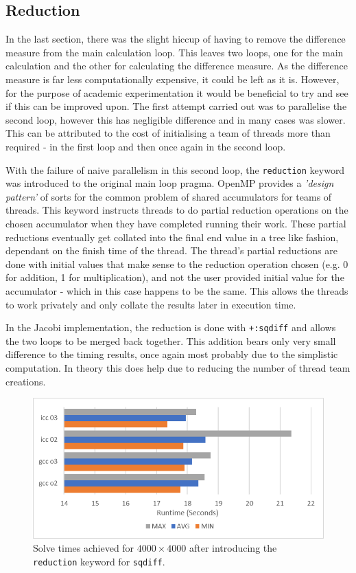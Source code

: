 \documentclass[11pt,twocolumn,a4paper]{article}
\begin{document}
\subsection{Reduction}
In the last section, there was the slight hiccup of having to remove the difference measure from the main calculation loop. This leaves two loops, one for the main calculation and the other for calculating the difference measure. As the difference measure is far less computationally expensive, it could be left as it is. However, for the purpose of academic experimentation it would be beneficial to try and see if this can be improved upon. The first attempt carried out was to parallelise the second loop, however this has negligible difference and in many cases was slower. This can be attributed to the cost of initialising a team of threads more than required - in the first loop and then once again in the second loop. \par

With the failure of naive parallelism in this second loop, the \texttt{reduction} keyword was introduced to the original main loop pragma. OpenMP provides a \textit{'design pattern'} of sorts for the common problem of shared accumulators for teams of threads. This keyword instructs threads to do partial reduction operations on the chosen accumulator when they have completed running their work. These partial reductions eventually get collated into the final end value in a tree like fashion, dependant on the finish time of the thread. The thread's partial reductions are done with initial values that make sense to the reduction operation chosen (e.g. 0 for addition, 1 for multiplication), and not the user provided initial value for the accumulator - which in this case happens to be the same. This allows the threads to work privately and only collate the results later in execution time. \par

In the Jacobi implementation, the reduction is done with \texttt{+:sqdiff} and allows the two loops to be merged back together. This addition bears only very small difference to the timing results, once again most probably due to the simplistic computation. In theory this does help due to reducing the number of thread team creations. \par

\begin{figure}[h]
        \centering
        \includegraphics[width=0.8\linewidth]{figures/3-INNER-REDUX.png}
        \caption{Solve times achieved for $4000\times4000$ after introducing the \texttt{reduction} keyword for \texttt{sqdiff}.}
        \label{fig-3-redux}
\end{figure}
\end{document}
